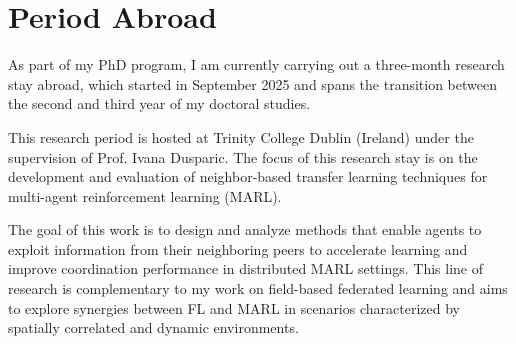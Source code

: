 \documentclass[runningheads]{llncs}
\begin{document}




\section{Period Abroad}
As part of my PhD program, I am currently carrying out a three-month research stay abroad, 
 which started in September 2025 and spans the transition between 
 the second and third year of my doctoral studies.

This research period is hosted at Trinity College Dublin (Ireland) 
 under the supervision of Prof. Ivana Dusparic. 
% 
The focus of this research stay is on the development and evaluation of neighbor-based transfer 
 learning techniques for multi-agent reinforcement learning (MARL).

The goal of this work is to design and analyze methods that enable agents to exploit information 
 from their neighboring peers to accelerate learning and improve coordination performance 
 in distributed MARL settings. 
% 
This line of research is complementary to my work on field-based federated learning and aims 
 to explore synergies between FL and MARL in scenarios characterized by spatially correlated and dynamic environments.
\end{document}
